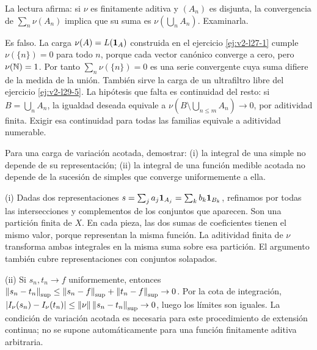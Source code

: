 \begin{ejercicio}\label{ej:v2-l29-1}
La lectura afirma: si $\nu$ es finitamente aditiva y $(A_n)$ es disjunta, la convergencia de $\sum_n\nu(A_n)$ implica que su suma es $\nu(\bigcup_nA_n)$. Examinarla.
\end{ejercicio}
\begin{solucion}
Es falso. La carga $\nu(A)=L(\mathbf1_{A})$ construida en el ejercicio \ref{ej:v2-l27-1} cumple $\nu(\{n\})=0$ para todo $n$, porque cada vector canónico converge a cero, pero $\nu(\mathbb N)=1$. Por tanto $\sum_n\nu(\{n\})=0$ es una serie convergente cuya suma difiere de la medida de la unión. También sirve la carga de un ultrafiltro libre del ejercicio \ref{ej:v2-l29-5}. La hipótesis que falta es continuidad del resto: si $B=\bigcup_nA_n$, la igualdad deseada equivale a $\nu(B\setminus\bigcup_{n\le m}A_n)\to0$, por aditividad finita. Exigir esa continuidad para todas las familias equivale a aditividad numerable.
\end{solucion}

\begin{ejercicio}\label{ej:v2-l29-2}
Para una carga de variación acotada, demostrar: (i) la integral de una simple no depende de su representación; (ii) la integral de una función medible acotada no depende de la sucesión de simples que converge uniformemente a ella.
\end{ejercicio}
\begin{solucion}
(i) Dadas dos representaciones $s=\sum_j a_j\mathbf1_{A_j}=\sum_kb_k\mathbf1_{B_k}$, refinamos por todas las intersecciones y complementos de los conjuntos que aparecen. Son una partición finita de $X$. En cada pieza, las dos sumas de coeficientes tienen el mismo valor, porque representan la misma función. La aditividad finita de $\nu$ transforma ambas integrales en la misma suma sobre esa partición. El argumento también cubre representaciones con conjuntos solapados.

(ii) Si $s_n,t_n\to f$ uniformemente, entonces $\left\lVert s_n-t_n\right\rVert_{\mathrm{sup}}\le\left\lVert s_n-f\right\rVert_{\mathrm{sup}}+\left\lVert t_n-f\right\rVert_{\mathrm{sup}}\to0$. Por la cota de integración, $|I_\nu(s_n)-I_\nu(t_n)|\le\left\lVert\nu\right\rVert\left\lVert s_n-t_n\right\rVert_{\mathrm{sup}}\to0$, luego los límites son iguales. La condición de variación acotada es necesaria para este procedimiento de extensión continua; no se supone automáticamente para una función finitamente aditiva arbitraria.
\end{solucion}


